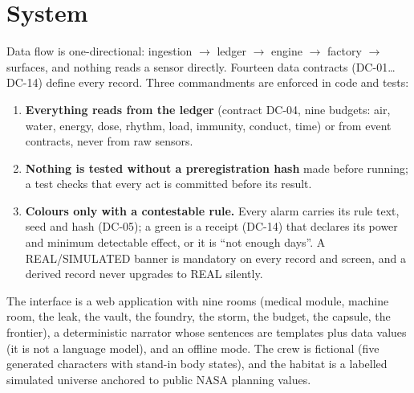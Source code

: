 \documentclass[conference]{IEEEtran}
\begin{document}
\section{System}
Data flow is one-directional: ingestion $\to$ ledger $\to$ engine $\to$ factory $\to$ surfaces, and nothing reads a sensor directly. Fourteen data contracts (DC-01\ldots DC-14) define every record. Three commandments are enforced in code and tests:
\begin{enumerate}
\item \textbf{Everything reads from the ledger} (contract DC-04, nine budgets: air, water, energy, dose, rhythm, load, immunity, conduct, time) or from event contracts, never from raw sensors.
\item \textbf{Nothing is tested without a preregistration hash} made before running; a test checks that every act is committed before its result.
\item \textbf{Colours only with a contestable rule.} Every alarm carries its rule text, seed and hash (DC-05); a green is a receipt (DC-14) that declares its power and minimum detectable effect, or it is ``not enough days''. A REAL/SIMULATED banner is mandatory on every record and screen, and a derived record never upgrades to REAL silently.
\end{enumerate}
The interface is a web application with nine rooms (medical module, machine room, the leak, the vault, the foundry, the storm, the budget, the capsule, the frontier), a deterministic narrator whose sentences are templates plus data values (it is not a language model), and an offline mode. The crew is fictional (five generated characters with stand-in body states), and the habitat is a labelled simulated universe anchored to public NASA planning values.
\end{document}
